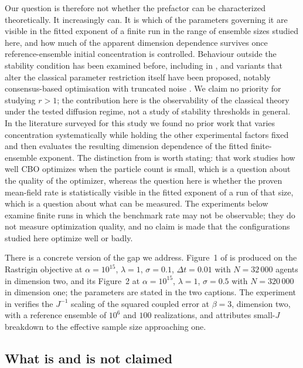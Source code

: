 \documentclass[pdflatex,sn-mathphys-num]{sn-jnl}
\theoremstyle{thmstyleone}
\theoremstyle{thmstyletwo}
\theoremstyle{thmstylethree}
\begin{document}
Our question is therefore not whether the prefactor can be characterized theoretically. It increasingly can. It is which of the parameters governing it are visible in the fitted exponent of a finite run in the range of ensemble sizes studied here, and how much of the apparent dimension dependence survives once reference-ensemble initial concentration is controlled. Behaviour outside the stability condition has been examined before, including in \cite{beddrich2024}, and variants that alter the classical parameter restriction itself have been proposed, notably consensus-based optimisation with truncated noise \cite{frrs2025}. We claim no priority for studying $r>1$; the contribution here is the observability of the classical theory under the tested diffusion regime, not a study of stability thresholds in general. In the literature surveyed for this study we found no prior work that varies concentration systematically while holding the other experimental factors fixed and then evaluates the resulting dimension dependence of the fitted finite-ensemble exponent. The distinction from \cite{beddrich2024} is worth stating: that work studies how well CBO optimizes when the particle count is small, which is a question about the quality of the optimizer, whereas the question here is whether the proven mean-field rate is statistically visible in the fitted exponent of a run of that size, which is a question about what can be measured. The experiments below examine finite runs in which the benchmark rate may not be observable; they do not measure optimization quality, and no claim is made that the configurations studied here optimize well or badly.

There is a concrete version of the gap we address. Figure~1 of \cite{fkr2024} is produced on the Rastrigin objective at $\alpha=10^{15}$, $\lambda=1$, $\sigma=0.1$, $\Delta t=0.01$ with $N=32\,000$ agents in dimension two, and its Figure~2 at $\alpha=10^{15}$, $\lambda=1$, $\sigma=0.5$ with $N=320\,000$ in dimension one; the parameters are stated in the two captions. The experiment in \cite[Subsection 2.6]{ghv2025} verifies the $J^{-1}$ scaling of the squared coupled error at $\beta=3$, dimension two, with a reference ensemble of $10^6$ and $100$ realizations, and attributes small-$J$ breakdown to the effective sample size approaching one.

\subsection{What is and is not claimed}\label{sec:scope}
\end{document}
